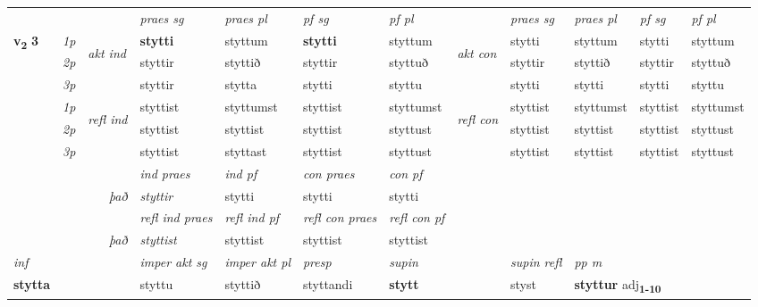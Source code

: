 \begin{longtable}[l]{X>{\footnotesize\itshape}llXXXXlXXXX}
 & &   & \textit{praes sg}  & \textit{praes pl}    & \textit{ pf sg} & \textit{pf pl} & & \textit{praes sg}  & \textit{praes pl}    & \textit{pf sg} & \textit{pf pl }  \\ \cmidrule{4-7} \cmidrule{9-12}
 \multirow{2}{*}{{{\textbf{v{\textsubscript{2}}} \Large{\textbf{3}}}}}  & 1p & \multirow{3}{*}{\begin{turn}{90}\textit{akt ind}\end{turn}} & \textbf{stytti} & styttum & \textbf{stytti} & styttum & \multirow{3}{*}{\begin{turn}{90}\textit{akt con}\end{turn}} &stytti & styttum & stytti & styttum\\*
 & 2p &  &  styttir  & styttið & styttir & styttuð & & styttir & styttið & styttir & styttuð \\*
 & 3p &  & styttir & stytta & stytti & styttu & & stytti & stytti& stytti & styttu \\*
\cmidrule{4-7} \cmidrule{9-12}
 & 1p & \multirow{3}{*}{\begin{turn}{90}\textit{refl ind}\end{turn}}  & styttist & styttumst & styttist & styttumst & \multirow{3}{*}{\begin{turn}{90}\textit{refl con}\end{turn}}  &styttist & styttumst & styttist & styttumst \\*
 & 2p &  & styttist & styttist & styttist & styttust & &styttist & styttist & styttist & styttust \\*
 & 3p  & & styttist & styttast & styttist & styttust & & styttist & styttist& styttist & styttust \\*
\cmidrule{4-7} \cmidrule{9-12}

   && &  \textit{ind praes} & \textit{ind pf} & \textit{con praes} & \textit{con pf} \\*
\multicolumn{3}{r}{\textit{það}} & styttir & stytti & stytti & stytti \\*

\cmidrule{4-7}
 & && \textit{refl ind praes} & \textit{refl ind pf} & \textit{refl con praes} & \textit{refl con pf} \\*
\multicolumn{3}{r}{\textit{það}}& styttist & styttist & styttist & styttist \\*

\cmidrule{4-7}
   {\textit{inf}} & &  & \textit{imper akt sg} & \textit{imper akt pl}   & \textit{presp} & \textit{supin} && \textit{supin refl} & \textit{pp m} \\*
  {\textbf{stytta}} & && styttu  & styttið   & styttandi &  \textbf{stytt} && styst & \multicolumn{2}{l}{\textbf{styttur} adj\textbf{\textsubscript{1-10}}} \\*


\end{longtable}
